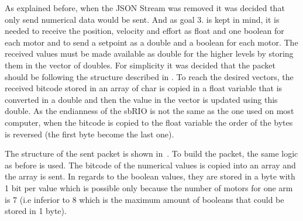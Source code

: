 As explained before, when the \gls{JSON} Stream was removed it was decided that only send numerical data would be sent. And as goal 3. is kept in mind, it is needed to receive the position, velocity and effort as float and one boolean for each motor and to send a setpoint as a double and a boolean for each motor. The received values must be made available as double for the higher levels by storing them in the vector of doubles. For simplicity it was decided that the packet should be following the structure described in . To reach the desired vectors, the received bitcode stored in an array of char is copied in a float variable that is converted in a double and then the value in the vector is updated using this double. As the endianness of the sbRIO is not the same as the one used on most computer, when the bitcode is copied to the float variable the order of the bytes is reversed (the first byte become the last one).

The structure of the sent packet is shown in~. To build the packet, the same logic as before is used. The bitcode of the numerical values is copied into an array and the array is sent.
In regards to the boolean values, they are stored in a byte with 1 bit per value which is possible only because the number of motors for one arm is 7 (i.e inferior to 8 which is the maximum amount of booleans that could be stored in 1 byte).

